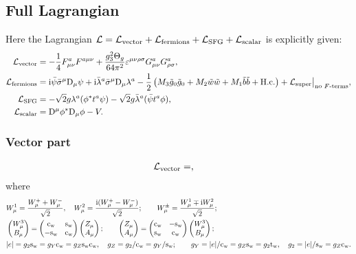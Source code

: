 \documentclass[CheatSheet]{subfiles}
\begin{document}
\subsection{Full Lagrangian}
Here the Lagrangian
 $\mathcal L = \mathcal L\w{vector} + \mathcal L\w{fermions} + \mathcal L\w{SFG} + \mathcal L\w{scalar}$ is explicitly given:
\begin{align}
 \mathcal L\w{vector}&=
- \frac14F^a_{\mu\nu}F^{a\mu\nu}
+ \frac{g_3^2\Theta_g}{64\pi^2}\vep^{\mu\nu\rho\sigma}G^a_{\mu\nu}G^a_{\rho\sigma},
\\
 \mathcal L\w{fermions}&=
  \ii\bpsi\bsigma^\mu\DD_\mu\psi
 + \ii\blambda^a\bsigma^\mu\DD_\mu\lambda^a
 - \frac12\left(M_3\tig_0\tig_0+M_2\tiw\tiw+M_1\tib\tib+\text{H.c.}\right)
 + \mathcal L\w{super}\big|_{\text{no $F$-terms}},
\\\mathcal L\w{SFG}&=
 -\sqrt2g\lambda^a(\phi^*t^a\psi) -\sqrt2g\blambda^a(\bpsi t^a\phi),
\\\mathcal L\w{scalar}&=
\DD^\mu\phi^*\DD_\mu\phi - V.
\end{align}
\subsubsection{Vector part}
\begin{align}
\begin{split}
   \mathcal L\w{vector}
 &=
 ,
\end{split}\label{eq:Lvector}
\end{align}
where
\begin{align*}
 &W^1_\mu = \frac{W^+_\mu+W^-_\mu}{\sqrt2},\quad
 W^2_\mu = \frac{{\mathrm{i}}(W^+_\mu-W^-_\mu)}{\sqrt2};\qquad
 W^\pm_\mu = \frac{W^1_\mu\mp{\mathrm{i}} W^2_\mu}{\sqrt2};
\\
 &\begin{pmatrix}W^3_\mu\\B_\mu\end{pmatrix} = \begin{pmatrix}\mathrm{c}_{\mathrm w} & \mathrm{s}_{\mathrm w} \\ -\mathrm{s}_{\mathrm w} & \mathrm{c}_{\mathrm w}\end{pmatrix} \begin{pmatrix}Z_\mu \\ A_\mu\end{pmatrix};\qquad
 \begin{pmatrix}Z_\mu\\A_\mu\end{pmatrix} = \begin{pmatrix}\mathrm{c}_{\mathrm w} & -\mathrm{s}_{\mathrm w} \\ \mathrm{s}_{\mathrm w} & \mathrm{c}_{\mathrm w}\end{pmatrix} \begin{pmatrix}W^3_\mu \\ B_\mu\end{pmatrix};\\
 &|e| = g_2\mathrm{s}_{\mathrm w} = g_Y\mathrm{c}_{\mathrm w} = g_Z\mathrm{s}_{\mathrm w}\mathrm{c}_{\mathrm w}, \quad
 g_Z  = g_2/\mathrm{c}_{\mathrm w} = g_Y/\mathrm{s}_{\mathrm w}; \qquad
 g_Y = |e|/\mathrm{c}_{\mathrm w} = g_Z\mathrm{s}_{\mathrm w} = g_2{\mathrm t}_{\mathrm w},\quad
 g_2 = |e|/\mathrm{s}_{\mathrm w} = g_Z\mathrm{c}_{\mathrm w}.
\end{align*}
\end{document}
